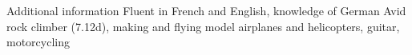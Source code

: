 \begin{rubric}{Additional information}
\entry*[Languages]%
  Fluent in French and English, knowledge of German
%
%
\entry*[Hobbies]%
  Avid rock climber (7.12d), 
  making and flying model airplanes and helicopters,
  guitar,
  motorcycling
%
%
\end{rubric} 
